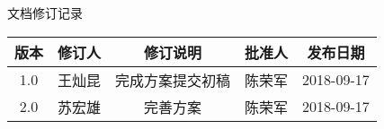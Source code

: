 \begin{center}
{\songti \subsubTitle 文档修订记录} \par

\setlength{\arrayrulewidth}{1.2pt} %
\setlength{\tabcolsep}{18pt} %
\renewcommand{\arraystretch}{1.5}  %

\songti\tableText
\begin{tabular}{ |c | c| c| c|  c |}
  \hline
  版本  & 修订人 & 修订说明 & 批准人 & 发布日期 \\
  \hline
  1.0 &  王灿昆 & 完成方案提交初稿 & 陈荣军 & 2018-09-17 \\
  \hline
  2.0 &  苏宏雄 & 完善方案 & 陈荣军 & 2018-09-17 \\
  \hline
\end{tabular}
\end{center}
